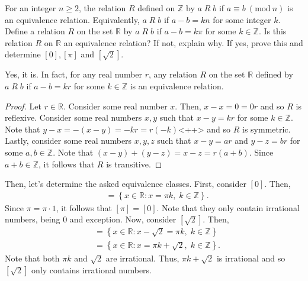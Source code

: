 \documentclass[12pt]{article}
\newcommand{\Z}{\mathbb{Z}}
\newcommand{\R}{\mathbb{R}}
\newcommand{\Mod}[1]{\ (\mathrm{mod}\ #1)}
\newenvironment{problem}[2][Problem]{\begin{trivlist} \item[\hskip \labelsep {\bfseries #1}\hskip \labelsep {\bfseries #2.}]}{\end{trivlist}}
\newenvironment{solution}[2][Solution]{\begin{trivlist} \item[\hskip \labelsep {\bfseries #1}\hskip \labelsep {\bfseries #2.}]}{\end{trivlist}}
\begin{document}
\begin{problem}{52}
\begin{solution}{52}
    \begin{problem}{53}
      For an integer $n\geq 2$, the relation $R$ defined on $\Z$ by $a\; R\; b$ if $a\equiv b \Mod n$ is an equivalence relation. Equivalently, $a\; R\; b$ if $a-b=kn$ for some integer $k$. Define a relation $R$ on the set $\R$ by $a\; R\; b$ if $a-b=k\pi$ for some $k\in\Z$. Is this relation $R$ on $\R$ an equivalence relation? If not, explain why. If yes, prove this and determine $[0], [\pi]$ and $[\sqrt{2}]$.
      \begin{solution}{53}
	Yes, it is. In fact, for any real number $r$, any relation $R$ on the set $\R$ defined by $a\; R\; b$ if $a-b=kr$ for some $k\in\Z$ is an equivalence relation.
	\begin{proof}
	  Let $r\in\R$. Consider some real number $x$. Then, $x-x=0=0r$ and so $R$ is reflexive. Consider some real numbers $x,y$ such that $x-y=kr$ for some $k\in\Z$. Note that $y-x = -(x-y) = -kr = r(-k)$<++> and so $R$ is symmetric. Lastly, consider some real numbers $x,y,z$ such that $x-y=ar$ and $y-z=br$ for some $a,b\in\Z$. Note that $(x-y)+(y-z)=x-z=r(a+b)$. Since $a+b\in\Z$, it follows that $R$ is transitive.
	\end{proof}
	Then, let's determine the asked equivalence classes. First, consider $[0]$. Then,
	\begin{align*}
	  [0] &= \left\{x\in\R:x=\pi k, \;k\in \Z\right\}.
	\end{align*}
	Since $\pi = \pi\cdot1$, it follows that $[\pi] = [0]$. Note that they only contain irrational numbers, being $0$ and exception. Now, consider $[\sqrt{2}]$. Then,
 \begin{align*}
   [\sqrt{2}] &= \left\{x\in\R:x-\sqrt{2} = \pi k, \; k\in \Z\right\}\\
   &= \left\{x\in\R:x=\pi k +\sqrt{2}, \; k\in \Z\right\}.
 \end{align*}
 Note that both $\pi k$ and $\sqrt{2}$ are irrational. Thus, $\pi k +\sqrt{2}$ is irrational and so $[\sqrt{2}]$ only contains irrational numbers.

      \end{solution}
    \end{problem}
  \end{solution}
 \end{problem}
\end{document}
